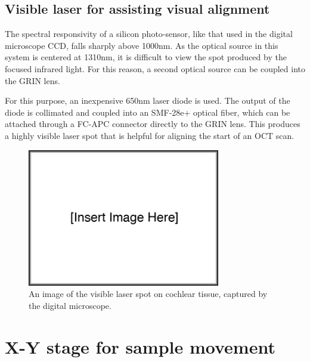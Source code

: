 \subsection{Visible laser for assisting visual alignment}


The spectral responsivity of a silicon photo-sensor, like that used in the digital microscope CCD, falls sharply above 1000nm. As the optical source in this system is centered at 1310nm, it is difficult to view the spot produced by the focused infrared light. For this reason, a second optical source can be coupled into the GRIN lens.

For this purpose, an inexpensive 650nm laser diode is used. The output of the diode is collimated and coupled into an SMF-28e+ optical fiber, which can be attached through a FC-APC connector directly to the GRIN lens. This produces a highly visible laser spot that is helpful for aligning the start of an OCT scan.

\begin{figure}[h!]
\centering
\includegraphics[width=0.75\textwidth]{Images/missing.png}
\caption[An image of the visible laser spot on cochlear tissue.]{An image of the visible laser spot on cochlear tissue, captured by the digital microscope.}
\end{figure}


\section{X-Y stage for sample movement}

